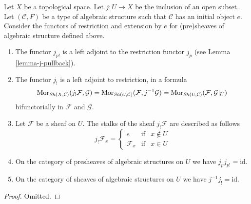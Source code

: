 \begin{lemma}
\label{lemma-j-shriek-structures}
Let $X$ be a topological space.
Let $j : U \to X$ be the inclusion of an open subset.
Let $(\mathcal{C}, F)$ be a type of algebraic structure
such that $\mathcal{C}$ has an initial object $e$.
Consider the functors of restriction and extension
by $e$ for (pre)sheaves of algebraic structure defined above.
\begin{enumerate}
\item The functor $j_{p!}$ is a left adjoint to the
restriction functor $j_p$ (see Lemma \ref{lemma-j-pullback}).
\item The functor $j_!$ is a left adjoint to restriction,
in a formula
$$
\mathop{\mathrm{Mor}}\nolimits_{\mathop{\mathit{Sh}}\nolimits(X, \mathcal{C})}(j_!\mathcal{F}, \mathcal{G})
=
\mathop{\mathrm{Mor}}\nolimits_{\mathop{\mathit{Sh}}\nolimits(U, \mathcal{C})}(\mathcal{F}, j^{-1}\mathcal{G})
=
\mathop{\mathrm{Mor}}\nolimits_{\mathop{\mathit{Sh}}\nolimits(U, \mathcal{C})}(\mathcal{F}, \mathcal{G}|_U)
$$
bifunctorially in $\mathcal{F}$ and $\mathcal{G}$.
\item Let $\mathcal{F}$ be a sheaf on $U$.
The stalks of the sheaf $j_!\mathcal{F}$ are described
as follows
$$
j_{!}\mathcal{F}_x =
\left\{
\begin{matrix}
e & \text{if} & x \not \in U \\
\mathcal{F}_x & \text{if} & x \in U
\end{matrix}
\right.
$$
\item On the category of presheaves of algebraic structures on $U$
we have $j_pj_{p!} = \text{id}$.
\item On the category of sheaves of algebraic structures on $U$
we have $j^{-1}j_! = \text{id}$.
\end{enumerate}
\end{lemma}

\begin{proof}
Omitted.
\end{proof}

